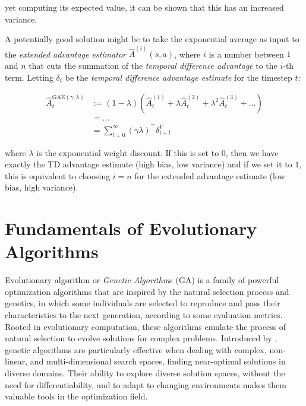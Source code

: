 yet computing its expected value, it can be shown that this has an increased variance.

A potentially good solution might be to take the exponential average as input to the \textit{extended advantage estimator} $\hat{A} ^{(i)}(s, a) $, where $i$ is a number between $1$ and $n$ that cuts the summation of the \textit{temporal difference advantage} to the $i$-th term. Letting $\delta _t$ be the \textit{temporal difference advantage estimate} for the timestep $t$:

\begin{align}
    \hat{A} _t ^{\text{GAE} (\gamma, \lambda)} & := (1 - \lambda)(\hat{A} _t ^{(1)} + \lambda \hat{A} _t ^{(2)} + \lambda ^2 \hat{A} _t ^{(3)} + \dots) \\
                                               & = \dots \nonumber                                                                                      \\
                                               & = \sum ^{ \infty } _{l = 0} (\gamma \lambda) ^\top \delta ^V _{t+l} \nonumber
\end{align}

where $\lambda$ is the exponential weight discount. If this is set to $0$, then we have exactly the \ac{TD} advantage estimate (high bias, low variance) and if we set it to $1$, this is equivalent to choosing $i=n$ for the extended advantage estimate (low bias, high variance).

\section{Fundamentals of Evolutionary Algorithms}

Evolutionary algorithm or \textit{Genetic Algorithm}s (\ac{GA}) is a family of powerful optimization algorithms that are inspired by the natural selection
process and genetics, in which some individuals are selected to reproduce and pass their characteristics to the next generation, according to some evaluation metrics. Rooted in evolutionary computation, these algorithms emulate the process of natural selection to evolve solutions for complex problems. Introduced by \citet{holland_1992_ga}, genetic algorithms are particularly effective when dealing with complex, non-linear, and multi-dimensional search spaces, finding near-optimal solutions in diverse domains. Their ability to explore diverse solution spaces, without the need for differentiability, and to adapt to changing environments makes them valuable tools in the optimization field. \citep{katoch_review_2021}

